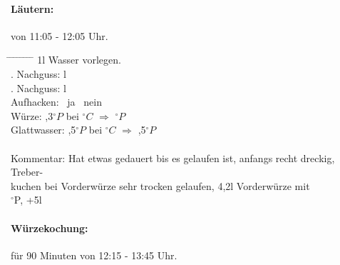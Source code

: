 \documentclass[12pt,oneside,a4paper]{scrartcl}
\begin{document}
{\paragraph{Läutern:} von 11:05 - 12:05 Uhr.
	\begin{tabbing}
		\hspace{1cm} \= \hspace{1cm} \= \hspace{1cm} \= \hspace{1cm} \= \hspace{1cm} \=\hspace{1cm} \=\hspace{1cm} \=\hspace{1cm} \= \kill
		\> 1l Wasser vorlegen.\\
		\> . Nachguss: \> \> 7 l\\
		\> . Nachguss: \> \> 5 l\\
		\> \> \> Aufhacken: \> \> \CheckedBox \ ja \> \> \Square \ nein\\
		\> Würze: \> \> ,3$^\circ P$ \> bei $^\circ C$ \> $\Rightarrow$ $^\circ P$\\
		\> Glattwasser: \> \> ,5$^\circ P$ \> bei $^\circ C$ \> $\Rightarrow$ ,5$^\circ P$\\\\
		\> Kommentar: \>\>\> Hat etwas gedauert bis es gelaufen ist, anfangs recht dreckig, Treber-\\
		\>\>\>\>kuchen bei Vorderwürze sehr trocken gelaufen, 4,2l Vorderwürze mit\\
		\>\>\>$^\circ$P, +5l\\
	\end{tabbing}
%
\paragraph{Würzekochung:} für 90 Minuten von 12:15 - 13:45 Uhr.\\
}
\end{document}
